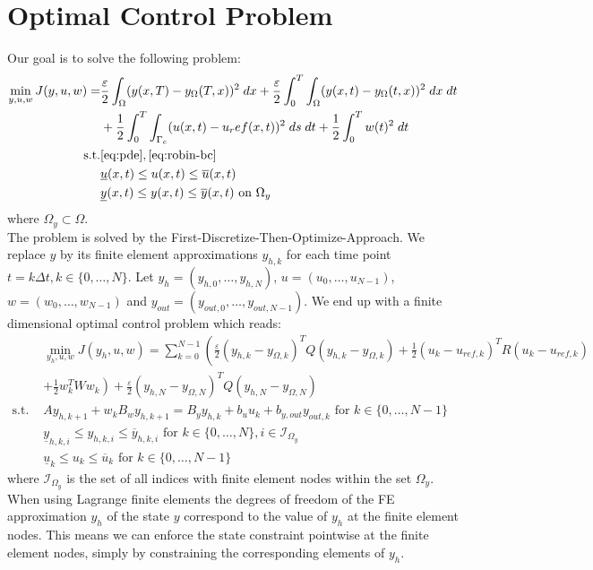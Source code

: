 \documentclass[
12pt, %
a4paper, %
onecolumn, %
portrait %
]{article}
\begin{document}
\section{Optimal Control Problem}
Our goal is to solve the following problem:
\begin{align*}
\min_{y,u, w} J(y, u, w) = & \frac{\varepsilon}{2}\int_{\Omega} (y(x, T) - y_{\Omega}(T,x))^2 \; dx + \frac{\varepsilon}{2} \int_{0}^{T} \int_{\Omega} (y(x,t) - y_{\Omega}(t,x))^2 \; dx \; dt \\
& + \frac{1}{2} \int_{0}^{T} \int_{\Gamma_c} (u(x,t) - u_ref(x,t))^2 \; ds \; dt + \frac{1}{2} \int_{0}^{T} w(t)^2 \; dt \\
\text{s.t.} & \eqref{eq:pde}, \eqref{eq:robin-bc} \\
& \underline{u}(x,t) \leq u(x,t) \leq \overline{u}(x,t) \\
& \underline{y}(x,t) \leq y(x,t) \leq \overline{y}(x,t) \text{ on } \Omega_y
\end{align*}
where $\Omega_y \subset \Omega$.
\\
The problem is solved by the First-Discretize-Then-Optimize-Approach.
We replace $y$ by its finite element approximations $y_{h,k}$ for each time point $t = k \Delta t, k \in \{0, \hdots, N\}$. Let $y_h = (y_{h,0}, \hdots, y_{h,N})$, $u = (u_0, \hdots, u_{N-1})$, $w = (w_0, \hdots, w_{N-1})$ and $y_{out} = (y_{out,0}, \hdots, y_{out,N-1})$.
We end up with a finite dimensional optimal control problem which reads:
\begin{align*}
& \min_{y_h,u, w} J(y_h, u, w) = \sum_{k=0}^{N-1} \left( \frac{\varepsilon}{2} (y_{h,k} - y_{\Omega,k})^T Q (y_{h,k} - y_{\Omega,k}) + \frac{1}{2} (u_k - u_{ref,k})^T R (u_k - u_{ref,k}) \right. \\  & \left. + \frac{1}{2} w_k^T W w_k \right) + \frac{\varepsilon}{2} (y_{h,N} - y_{\Omega,N})^T Q (y_{h,N} - y_{\Omega,N}) \\
\text{s.t. }  & A y_{h,k+1} + w_k B_w y_{h,k+1} = B_y y_{h,k} + b_u u_k + b_{y,out} y_{out,k} \text{ for } k \in \{0, \hdots, N-1\} \\
&\underline{y}_{h,k,i} \leq y_{h,k,i} \leq \overline{y}_{h,k,i} \text{ for } k \in \{0, \hdots, N\}, i \in \mathcal{I}_{\Omega_y} \\
&\underline{u}_{k} \leq u_{k} \leq \overline{u}_{k} \text{ for } k \in \{0, \hdots, N-1\}
\end{align*}
where $\mathcal{I}_{\Omega_y}$ is the set of all indices with finite element nodes within the set $\Omega_y$. When using Lagrange finite elements the degrees of freedom of the FE approximation $y_h$ of the state $y$ correspond to the value of $y_h$ at the finite element nodes. This means we can enforce the state constraint pointwise at the finite element nodes, simply by constraining the corresponding elements of $y_h$. \\
\end{document}
